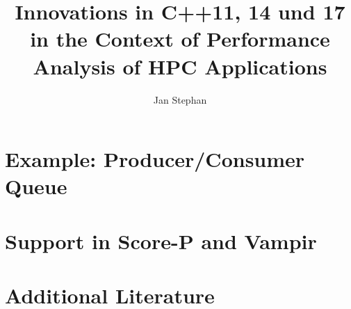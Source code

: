 \documentclass[utf8,hauptseminar]{zihpub}
\author{Jan Stephan}
\title{Innovations in C++11, 14 und 17 in the Context of Performance Analysis of HPC Applications}
\begin{document}

 
\section{Example: Producer/Consumer Queue}

\section{Support in Score-P and Vampir}

\section{Additional Literature}


{}
\end{document}
